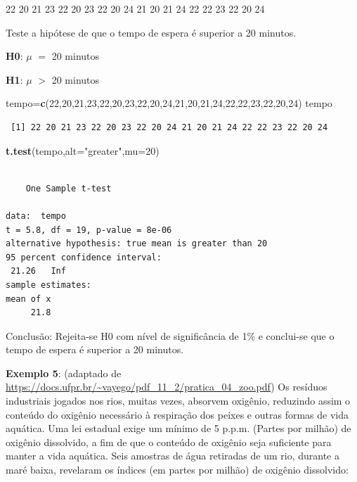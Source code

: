 \documentclass[12pt,brazil,]{book}
\newenvironment{Shaded}{\begin{snugshade}}{\end{snugshade}}
\newcommand{\DataTypeTok}[1]{\textcolor[rgb]{0.13,0.29,0.53}{#1}}
\newcommand{\DecValTok}[1]{\textcolor[rgb]{0.00,0.00,0.81}{#1}}
\newcommand{\KeywordTok}[1]{\textcolor[rgb]{0.13,0.29,0.53}{\textbf{#1}}}
\newcommand{\NormalTok}[1]{#1}
\newcommand{\StringTok}[1]{\textcolor[rgb]{0.31,0.60,0.02}{#1}}
\begin{document}
22 20 21 23 22 20 23 22 20 24 21 20 21 24 22 22 23 22 20 24

Teste a hipótese de que o tempo de espera é superior a 20 minutos.

\textbf{H0}: \(\mu\) \(=\) 20 minutos

\textbf{H1}: \(\mu\) \(>\) 20 minutos

\begin{Shaded}
\begin{Highlighting}[]
\NormalTok{tempo=}\KeywordTok{c}\NormalTok{(}\DecValTok{22}\NormalTok{,}\DecValTok{20}\NormalTok{,}\DecValTok{21}\NormalTok{,}\DecValTok{23}\NormalTok{,}\DecValTok{22}\NormalTok{,}\DecValTok{20}\NormalTok{,}\DecValTok{23}\NormalTok{,}\DecValTok{22}\NormalTok{,}\DecValTok{20}\NormalTok{,}\DecValTok{24}\NormalTok{,}\DecValTok{21}\NormalTok{,}\DecValTok{20}\NormalTok{,}\DecValTok{21}\NormalTok{,}\DecValTok{24}\NormalTok{,}\DecValTok{22}\NormalTok{,}\DecValTok{22}\NormalTok{,}\DecValTok{23}\NormalTok{,}\DecValTok{22}\NormalTok{,}\DecValTok{20}\NormalTok{,}\DecValTok{24}\NormalTok{)}
\NormalTok{tempo}
\end{Highlighting}
\end{Shaded}

\begin{verbatim}
 [1] 22 20 21 23 22 20 23 22 20 24 21 20 21 24 22 22 23 22 20 24
\end{verbatim}

\begin{Shaded}
\begin{Highlighting}[]
\KeywordTok{t.test}\NormalTok{(tempo,}\DataTypeTok{alt=}\StringTok{"greater"}\NormalTok{,}\DataTypeTok{mu=}\DecValTok{20}\NormalTok{)}
\end{Highlighting}
\end{Shaded}

\begin{verbatim}

    One Sample t-test

data:  tempo
t = 5.8, df = 19, p-value = 8e-06
alternative hypothesis: true mean is greater than 20
95 percent confidence interval:
 21.26   Inf
sample estimates:
mean of x 
     21.8 
\end{verbatim}

Conclusão: Rejeita-se H0 com nível de significância de 1\% e conclui-se
que o tempo de espera é superior a 20 minutos.

\textbf{Exemplo 5}: (adaptado de
\url{https://docs.ufpr.br/~vayego/pdf_11_2/pratica_04_zoo.pdf}) Os
resíduos industriais jogados nos rios, muitas vezes, absorvem oxigênio,
reduzindo assim o conteúdo do oxigênio necessário à respiração dos
peixes e outras formas de vida aquática. Uma lei estadual exige um
mínimo de 5 p.p.m. (Partes por milhão) de oxigênio dissolvido, a fim de
que o conteúdo de oxigênio seja suficiente para manter a vida aquática.
Seis amostras de água retiradas de um rio, durante a maré baixa,
revelaram os índices (em partes por milhão) de oxigênio dissolvido:
\end{document}

